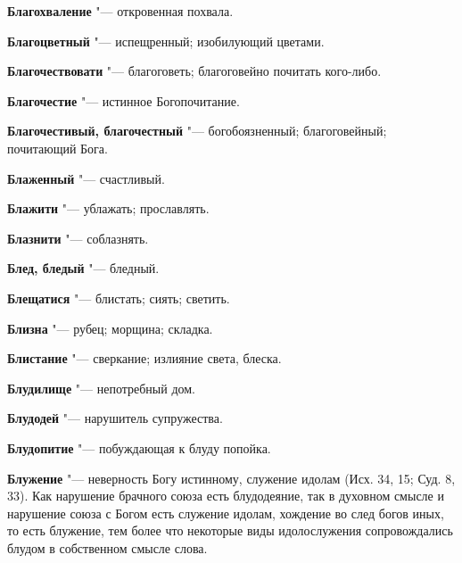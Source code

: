 \begin{mymulticols}{2}
\noindent\textbf{Благохваление} "--- откровенная похвала. 




\noindent\textbf{Благоцветный} "--- испещренный; изобилующий цветами. 




\noindent\textbf{Благочествовати} "--- благоговеть; благоговейно почитать кого-либо. 




\noindent\textbf{Благочестие} "--- истинное Богопочитание. 




\noindent\textbf{Благочестивый, благочестный} "--- богобоязненный; благоговейный; почитающий Бога. 




\noindent\textbf{Блаженный} "--- счастливый. 




\noindent\textbf{Блажити} "--- ублажать; прославлять. 




\noindent\textbf{Блазнити} "--- соблазнять. 




\noindent\textbf{Блед, бледый} "--- бледный. 




\noindent\textbf{Блещатися} "--- блистать; сиять; светить. 




\noindent\textbf{Близна} "--- рубец; морщина; складка. 




\noindent\textbf{Блистание} "--- сверкание; излияние света, блеска. 




\noindent\textbf{Блудилище} "--- непотребный дом. 




\noindent\textbf{Блудодей} "--- нарушитель супружества. 




\noindent\textbf{Блудопитие} "--- побуждающая к блуду попойка. 




\noindent\textbf{Блужение} "--- неверность Богу истинному, служение идолам (Исх. 34, 15; Суд. 8, 33). Как нарушение брачного союза есть блудодеяние, так в духовном смысле и нарушение союза с Богом есть служение идолам, хождение во след богов иных, то есть блужение, тем более что некоторые виды идолослужения сопровождались блудом в собственном смысле слова. 





\end{mymulticols}
